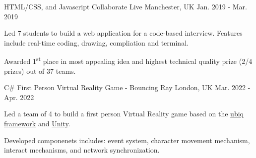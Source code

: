 \begin{cventries}
    \cventry
    {HTML/CSS, and Javascript} %
    {Collaborate Live} %
    {Manchester, UK} %
    {Jan. 2019 - Mar. 2019} %
    {
      \begin{cvitems} %
        \item {Led 7 students to build a web application for a code-based interview. Features include real-time coding, drawing, compliation and terminal.}
        \item {Awarded 1\textsuperscript{st} place in most appealing idea and highest technical quality prize (2/4 prizes) out of 37 teams.}
      \end{cvitems}
    }


  \cventry
    {C\#} %
    {First Person Virtual Reality Game - Bouncing Ray} %
    {London, UK} %
    {Mar. 2022 - Apr. 2022} %
    {
      \begin{cvitems} %
        \item {Led a team of 4 to build a first person Virtual Reality game based on the \href{https://github.com/UCL-VR/ubiq}{ubiq framework} and \href{https://unity.com/}{Unity}.}
        \item {Developed componenets includes: event system, character movement mechanism, interact mechanisms, and network synchronization.}
      \end{cvitems}
    }



\end{cventries}

